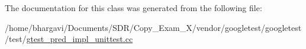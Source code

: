The documentation for this class was generated from the following file\+:\begin{DoxyCompactItemize}
\item 
/home/bhargavi/\+Documents/\+S\+D\+R/\+Copy\+\_\+\+Exam\+\_\+X/vendor/googletest/googletest/test/\hyperlink{gtest__pred__impl__unittest_8cc}{gtest\+\_\+pred\+\_\+impl\+\_\+unittest.\+cc}\end{DoxyCompactItemize}
